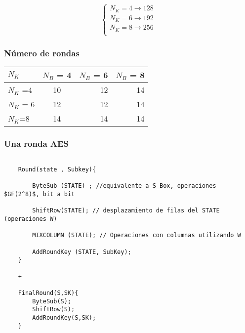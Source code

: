		$$\begin{cases}
		N_K = 4 \rightarrow 128\\
		N_K = 6 \rightarrow 192\\
		N_K = 8 \rightarrow 256\\
		\end{cases}$$
		
\subsubsection{Número de rondas}
	\begin{center}
		
		\begin{tabular}{l | c | r | r }
		$N_K$ & $N_B$ = 4 & $N_B$ = 6 & $N_B$ = 8\\
		\hline
		$N_K$ =4 &  10 & 12 & 14\\
		\hline
		$N_K$ = 6 & 12 & 12 & 14\\
		\hline
		$N_K$=8 & 14 & 14 & 14
		
		\end{tabular}
	\end{center}

\subsubsection{Una ronda AES}
\lstset{language=C, breaklines=true, basicstyle=\footnotesize}
\begin{lstlisting}[frame=single]

	Round(state , Subkey){
	
		ByteSub (STATE) ; //equivalente a S_Box, operaciones $GF(2^8)$, bit a bit
	
		ShiftRow(STATE); // desplazamiento de filas del STATE (operaciones W)
	
		MIXCOLUMN (STATE); // Operaciones con columnas utilizando W
	
		AddRoundKey (STATE, SubKey);
	} 
	
	+
	 
	FinalRound(S,SK){
		ByteSub(S);
		ShiftRow(S);
		AddRoundKey(S,SK);
	}
		
\end{lstlisting}

